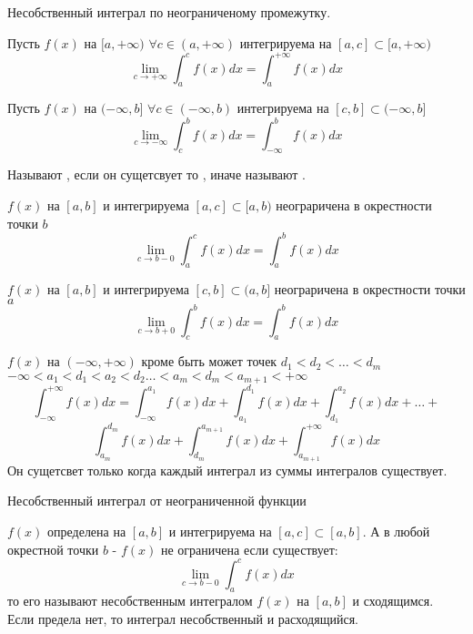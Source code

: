 \begin{title}[\Large]
    Несобственный интеграл по неограниченому промежутку.
\end{title}

\begin{defin}
    Пусть $f(x)$ на $[a,+\infty)$ $\forall c \in (a, +\infty)$ интегрируема
    на $[a,c] \subset [a, +\infty)$
    \[\lim_{c \to +\infty} \int_a^c f(x)dx = \int_a^{+\infty} f(x)dx\]
\end{defin}

\begin{defin}
    Пусть $f(x)$ на $(-\infty, b]$ $\forall c \in (-\infty, b)$ интегрируема
    на $[c,b] \subset (-\infty, b]$
    \[\lim_{c \to -\infty} \int_c^b f(x)dx = \int_{-\infty}^b f(x)dx\]
\end{defin}

Называют , если он сущетсвует то
, иначе называют .

\begin{defin}
    $f(x)$ на $[a,b]$ и интегрируема $[a,c] \subset [a,b)$ неограричена в
    окрестности точки $b$
    \[\lim_{c \to b -0} \int_a^c f(x)dx = \int_a^b f(x)dx\]
\end{defin}

\begin{defin}
    $f(x)$ на $[a,b]$ и интегрируема $[c,b] \subset (a,b]$ неограричена в
    окрестности точки $a$
    \[\lim_{c \to b +0} \int_c^b f(x)dx = \int_a^b f(x)dx\]
\end{defin}

\begin{defin}
    $f(x)$ на $(-\infty, +\infty)$ кроме быть может точек
    $d_1 < d_2 < \ldots < d_m$\\
    $-\infty < a_1 < d_1 < a_2 < d_2 \ldots < a_m < d_m < a_{m+1} < +\infty$
    \[
        \int_{-\infty}^{+\infty} f(x)dx = \int_{-\infty}^{a_1}f(x)dx +
        \int_{a_1}^{d_1}f(x)dx + \int_{d_1}^{a_2}f(x)dx + \ldots +
    \]
    \[
        \int_{a_m}^{d_m}f(x)dx + \int_{d_m}^{a_{m+1}}f(x)dx +
        \int_{a_{m+1}}^{+\infty}f(x)dx
    \]
        Он сущетсвет только когда каждый интеграл из суммы интегралов существует.
\end{defin}
\begin{title}[\Large]
  Несобственный интеграл от неограниченной функции
\end{title}

$f(x)$ определена на $[a, b]$ и интегрируема на $[a, c] \subset [a, b]$. А в
любой окрестной точки $b$ - $f(x)$ не ограничена если существует:
\[
  \lim_{c \to b - 0} \int^{c}_{a} f(x)dx
  \]
то его называют несобственным интегралом $f(x)$ на $[a, b]$ и сходящимся.\\
Если предела нет, то интеграл несобственный и расходящийся.

